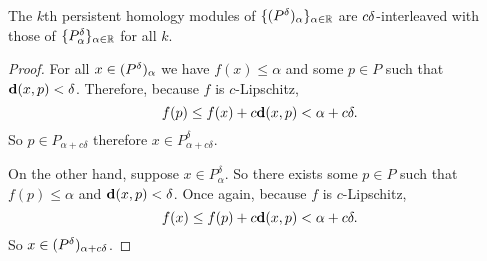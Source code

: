 \begin{lemma}\label{lem:ps_inter}
  The $k$th persistent homology modules of $\{(\P)_\alpha\}_{\alpha\in\R}$ are $c\of$-interleaved with those of $\{P_\alpha^\of\}_{\alpha\in\R}$ for all $k$.
\end{lemma}
\begin{proof}
  For all $x\in (\P)_\alpha$ we have $f(x)\leq \alpha$ and some $p\in P$ such that $\dist(x, p) < \of$.
  Therefore, because $f$ is $c$-Lipschitz,
  \[ f(p)\leq f(x) + c\dist(x, p) < \alpha + c\delta.\]
  So $p\in P_{\alpha + c\delta}$ therefore $x\in P_{\alpha+c\delta}^\delta$.

  On the other hand, suppose $x\in P_\alpha^\delta$.
  So there exists some $p\in P$ such that $f(p)\leq \alpha$ and $\dist(x, p) < \delta$.
  Once again, because $f$ is $c$-Lipschitz,
  \[ f(x)\leq f(p)+c\dist(x, p) < \alpha + c\of. \]
  So $x\in (\P)_{\alpha+c\delta}$.


\end{proof}
